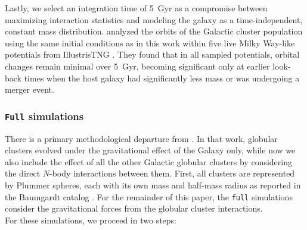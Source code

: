 \documentclass{aa}
\begin{document}
    Lastly, we select an integration time of 5~Gyr as a compromise between maximizing interaction statistics and modeling the galaxy as a time-independent, constant mass distribution. \citet{2023A&A...673A.152I} analyzed the orbits of the Galactic cluster population using the same initial conditions as in this work within five live Milky Way-like potentials from IllustrisTNG \citep{2018MNRAS.473.4077P}. They found that in all sampled potentials, orbital changes remain minimal over 5~Gyr, becoming significant only at earlier look-back times when the host galaxy had significantly less mass or was undergoing a merger event.


    \subsubsection*{ \texttt{Full} simulations}
    There is a primary methodological departure from \citet{2023A&A...673A..44F}.  In that work, globular clusters evolved under the gravitational effect of the Galaxy only, while now we also include the effect of all the other Galactic globular clusters by considering the direct $N$-body interactions between them. First, all clusters are represented by Plummer spheres, each with its own mass and half-mass radius as reported in the Baumgardt catalog \citep{2021MNRAS.505.5957B}. For the remainder of this paper, the \texttt{full} simulations consider the gravitational forces from the globular cluster interactions. \\
    For these simulations, we proceed in two steps:
\end{document}

